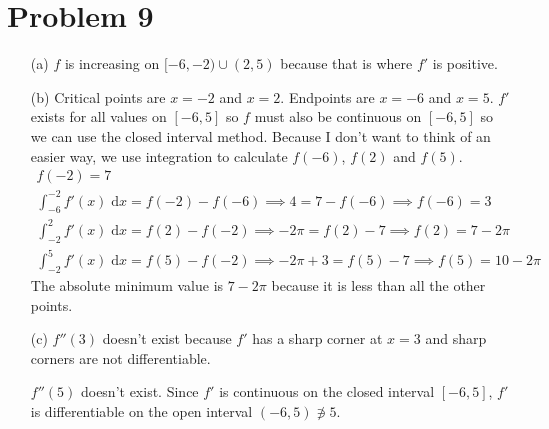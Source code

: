 \documentclass{article}
\newcommand*{\problem}[1]{\section*{Problem #1}}
\newcommand*{\dinteg}[4][x]{\ensuremath{\displaystyle\int_{#2}^{#3}#4\;\mathrm{d}#1}}
\begin{document}
\problem{9}
\begin{itemize}
	\item[(a)]
	$f$ is increasing on $[-6,-2)\cup(2,5)$ because that is where $f'$ is positive.

	\item[(b)]
	Critical points are $x=-2$ and $x=2$. Endpoints are $x=-6$ and $x=5$. $f'$ exists for all values on $[-6,5]$ so $f$ must also be continuous on $[-6,5]$ so we can use the closed interval method. Because I don't want to think of an easier way, we use integration to calculate $f(-6)$, $f(2)$ and $f(5)$.
	\begin{gather*}
		f(-2)=7 \\
		\dinteg{-6}{-2}{f'(x)}=f(-2)-f(-6) \implies 4=7-f(-6) \implies f(-6)=3 \\
		\dinteg{-2}{2}{f'(x)}=f(2)-f(-2) \implies -2\pi=f(2)-7 \implies f(2)=7-2\pi \\
		\dinteg{-2}{5}{f'(x)}=f(5)-f(-2) \implies -2\pi+3=f(5)-7 \implies f(5)=10-2\pi
	\end{gather*}
	The absolute minimum value is $7-2\pi$ because it is less than all the other points.

	\item[(c)]
	$f''(3)$ doesn't exist because $f'$ has a sharp corner at $x=3$ and sharp corners are not differentiable.

	$f''(5)$ doesn't exist. Since $f'$ is continuous on the closed interval $[-6,5]$, $f'$ is differentiable on the open interval $(-6,5)\not\ni5$.
\end{itemize}
\end{document}
